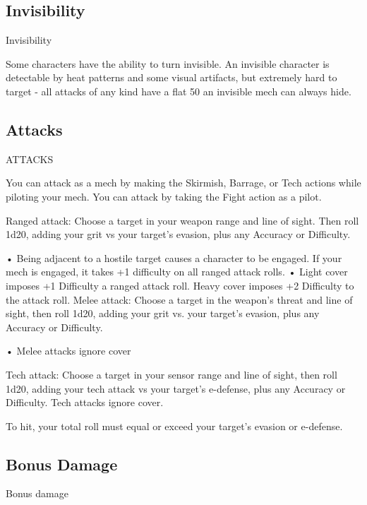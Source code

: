                                                                                                                    
\subsection{Invisibility}

                                                 Invisibility  

Some characters have the ability to turn invisible. An invisible character is detectable by heat  
patterns and some visual artifacts, but extremely hard to target - all attacks of any kind have a  
flat 50%
an invisible mech can always hide.  
\subsection{Attacks}
                                                  ATTACKS  

You can attack as a mech by making the Skirmish, Barrage, or Tech actions while piloting your  
mech. You can attack by taking the Fight action as a pilot.
 
Ranged attack: Choose a target in your weapon range and line of sight. Then roll 1d20, adding  
your grit vs your target’s evasion, plus any Accuracy or Difficulty.
 
                      •  Being adjacent to a hostile target causes a character to be engaged. If your  
                        mech is engaged, it takes +1 difficulty on all ranged attack rolls.  
                      •  Light cover imposes +1 Difficulty a ranged attack roll. Heavy cover imposes  
                        +2 Difficulty to the attack roll.  
Melee attack: Choose a target in the weapon’s threat and line of sight, then roll 1d20, adding  
your grit vs. your target’s evasion, plus any Accuracy or Difficulty.
 
                      •  Melee attacks ignore cover
 
Tech attack: Choose a target in your sensor range and line of sight, then roll 1d20, adding your  
tech attack vs your target’s e-defense, plus any Accuracy or Difficulty. Tech attacks ignore  
cover.
 

To hit, your total roll must equal or exceed your target’s evasion or e-defense.
 
\subsection{Bonus Damage}
                                             Bonus damage  

